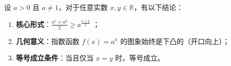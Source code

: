 \begin{statementbox}
设 $a > 0$ 且 $a \neq 1$，对于任意实数 $x, y \in \mathbb{R}$，有以下结论：
\begin{enumerate}
    \item \textbf{核心形式}：$\frac{a^x + a^y}{2} \geqslant a^{\frac{x+y}{2}}$ ；
    \item \textbf{几何意义}：指数函数 $f(x) = a^x$ 的图象始终是下凸的（开口向上）；
    \item \textbf{等号成立条件}：当且仅当 $x = y$ 时，等号成立。
\end{enumerate}
\end{statementbox}